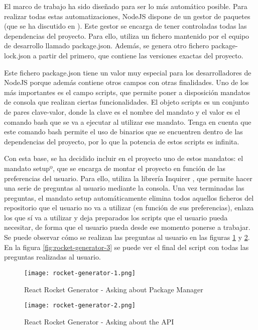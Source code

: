 El marco de trabajo ha sido diseñado para ser lo más automático posible. Para realizar todas estas automatizaciones, NodeJS dispone de un gestor de paquetes (que se ha discutido en ). Este gestor se encarga de tener controladas todas las dependencias del proyecto. Para ello, utiliza un fichero mantenido por el equipo de desarrollo llamado package.json. Además, se genera otro fichero package-lock.json a partir del primero, que contiene las versiones exactas del proyecto.

Este fichero package.json tiene un valor muy especial para los desarrolladores de NodeJS porque además contiene otros campos con otras finalidades. Uno de los más importantes es el campo scripts, que permite poner a disposición mandatos de consola que realizan ciertas funcionalidades. El objeto scripts es un conjunto de pares clave-valor, donde la clave es el nombre del mandato y el valor es el comando bash que se va a ejecutar al utilizar ese mandato. Tenga en cuenta que este comando bash permite el uso de binarios que se encuentren dentro de las dependencias del proyecto, por lo que la potencia de estos scripts es infinita.

Con esta base, se ha decidido incluir en el proyecto uno de estos mandatos: el mandato setupº, que se encarga de montar el proyecto en función de las preferencias del usuario. Para ello, utiliza la librería Inquirer \cite{NPMLINQ}, que permite hacer una serie de preguntas al usuario mediante la consola. Una vez terminadas las preguntas, el mandato setup automáticamente elimina todos aquellos ficheros del repositorio que el usuario no va a utilizar (en función de sus preferencias), enlaza los que sí va a utilizar y deja preparados los scripts que el usuario pueda necesitar, de forma que el usuario pueda desde ese momento ponerse a trabajar. Se puede observar cómo se realizan las preguntas al usuario en las figuras \cref{fig:rocket-generator-1} y \cref{fig:rocket-generator-2}. En la figura \cref{fig:rocket-generator-3} se puede ver el final del script con todas las preguntas realizadas al usuario.

\begin{figure}
  \centering
  \texttt{[image: rocket-generator-1.png]}
  \caption{React Rocket Generator - Asking about Package Manager}
  \label{fig:rocket-generator-1}
\end{figure}

\begin{figure}
  \centering
  \texttt{[image: rocket-generator-2.png]}
  \caption{React Rocket Generator - Asking about the API}
  \label{fig:rocket-generator-2}
\end{figure}

